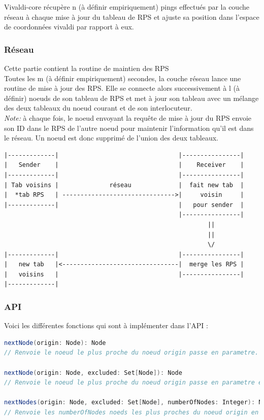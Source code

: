 \documentclass[11pt,a4paper]{article}
\begin{document}
Vivaldi-core récupère n (à définir empiriquement) pings effectués par la couche réseau à chaque mise à jour du tableau de RPS et ajuste sa position dans l’espace de coordonnées vivaldi par rapport à eux.

\subsubsection{Réseau}
Cette partie contient la routine de maintien des RPS\\

Toutes les m (à définir empiriquement) secondes, la couche réseau lance une routine de mise à jour des RPS. Elle se connecte alors successivement à l (à définir) noeuds de son tableau de RPS et met à jour son tableau avec un mélange des deux tableaux du noeud courant et de son interlocuteur. \\

\emph{Note:} à chaque fois, le noeud envoyant la requête de mise à jour du RPS envoie son ID dans le RPS de l’autre noeud pour maintenir l’information qu’il est dans le réseau. Un noeud est donc supprimé de l’union des deux tableaux.\\

\begin{verbatim}
|-------------|                                 |----------------|
|   Sender    |                                 |    Receiver    |
|-------------|                                 |----------------|
| Tab voisins |              réseau             |  fait new tab  |
|  *tab RPS   | ------------------------------->|     voisin     |
|-------------|                                 |   pour sender  |
                                                |----------------|
                                                        ||
                                                        ||
                                                        \/
|-------------|                                 |----------------|
|   new tab   |<--------------------------------|  merge les RPS |
|   voisins   |                                 |----------------|
|-------------|

\end{verbatim}
\subsubsection{API}
Voici les différentes fonctions qui sont à implémenter dans l’API :

\begin{lstlisting}[language=scala]
nextNode(origin: Node): Node
// Renvoie le noeud le plus proche du noeud origin passe en parametre.

nextNode(origin: Node, excluded: Set[Node]): Node
// Renvoie le noeud le plus proche du noeud origin passe en parametre en excluant la liste de noeuds excluded.

nextNodes(origin: Node, excluded: Set[Node], numberOfNodes: Integer): Node
// Renvoie les numberOfNodes noeds les plus proches du noeud origin en exluant la liste de noeuds excluded.
\end{lstlisting}
\end{document}

